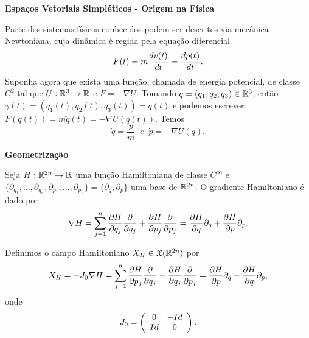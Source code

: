 \documentclass{beamer}
\newcommand{\titulo}[1]{\centering \textbf{#1}}
\begin{document}
\begin{frame}
	\titulo{Espaços Vetoriais Simpléticos - Origem na Física}
	
	Parte dos sistemas físicos conhecidos podem ser descritos via mecânica Newtoniana, cuja dinâmica é regida pela equação diferencial 
	$$
	F(t) = m\frac{d v(t)}{d t} = \frac{d p(t)}{d t}.
	$$
	Suponha agora que exista uma função, chamada de energia potencial, de classe $C^{2}$ tal que $U:\mathbb{R}^{3}\to \mathbb{R}^{}$ e $F = -\nabla U$. Tomando $q=(q_{1},q_{2}, q_{3})\in \mathbb{R}^{3}$, então $\gamma(t)=(q_{1}(t),q_{2}(t), q_{3}(t)) = q(t)$ e podemos escrever $F(q(t)) =m \ddot{q}(t)= -\nabla U(q(t))$. Temos
	$$
	\dot{q} = \frac{p}{m} \;\; e \;\;\dot{p} = -\nabla U(q).
	$$	
\end{frame}

\begin{frame}
	\titulo{Geometrização}
	
	Seja $H:\mathbb{R}^{2n} \to \mathbb{R}^{}$ uma função Hamiltoniana de classe $C^{\infty}$ e $\{\partial_{q_{1}}, \dots, \partial_{q_{n}}, \partial_{p_{1}}, \dots, \partial_{p_{n}}\}=\{\partial_{q}, \partial_{p}\}$ uma base de $\mathbb{R}^{2n}$. O gradiente Hamiltoniano é dado por
	$$
	\nabla H =\sum_{j=1}^{n}\frac{\partial H}{\partial q_{j}}\frac{\partial }{\partial q_{j}} + \frac{\partial H}{\partial p_{j}}\frac{\partial }{\partial p_{j}} = \frac{\partial H}{\partial q}\partial_{q} + \frac{\partial H}{\partial p}\partial_{p}.
	$$
	
	Definimos o campo Hamiltoniano $X_{H} \in \mathfrak{X}(\mathbb{R}^{2n})$ por 
	$$
	X_{H} = -J_{0} \nabla H = \sum_{j=1}^{n}\frac{\partial H}{\partial p_{j}}\frac{\partial }{\partial q_{j}} - \frac{\partial H}{\partial q_{j}}\frac{\partial }{\partial p_{j}} = \frac{\partial H}{\partial p}\partial_{q} - \frac{\partial H}{\partial q}\partial_{p}, 
	$$
	onde
	$$
	J_{0}=
	\left(
	\begin{array}{cc}
	0 & -Id
	\\
	Id & 0
	\end{array}
	\right). 
	$$
\end{frame}
\end{document}
